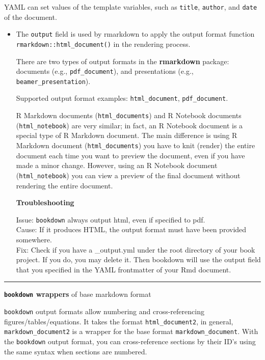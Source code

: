\documentclass[
]{book}
\theoremstyle{definition}
\theoremstyle{definition}
\theoremstyle{definition}
\theoremstyle{definition}
\theoremstyle{remark}
\begin{document}
YAML can set values of the template variables, such as \texttt{title}, \texttt{author}, and \texttt{date} of the document.

\begin{itemize}
\item
  The \texttt{output} field is used by rmarkdown to apply the output format function \texttt{rmarkdown::html\_document()} in the rendering process.

  There are two types of output formats in the \textbf{rmarkdown} package: documents (e.g., \texttt{pdf\_document}), and presentations (e.g., \texttt{beamer\_presentation}).

  Supported output format examples: \texttt{html\_document}, \texttt{pdf\_document}.

  R Markdown documents (\texttt{html\_documents}) and R Notebook documents (\texttt{html\_notebook}) are very similar; in fact, an R Notebook document is a special type of R Markdown document. The main difference is using R Markdown document (\texttt{html\_documents}) you have to knit (render) the entire document each time you want to preview the document, even if you have made a minor change. However, using an R Notebook document (\texttt{html\_notebook}) you can view a preview of the final document without rendering the entire document.

  \textbf{Troubleshooting}

  Issue: \texttt{bookdown} always output html, even if specified to pdf.\\
  Cause: If it produces HTML, the output format must have been provided somewhere.\\
  Fix: Check if you have a \_output.yml under the root directory of your book project. If you do, you may delete it. Then bookdown will use the output field that you specified in the YAML frontmatter of your Rmd document.
\end{itemize}

\begin{center}\rule{0.5\linewidth}{0.5pt}\end{center}

\textbf{\texttt{bookdown} wrappers} of base markdown format

\texttt{bookdown} output formats allow numbering and cross-referencing figures/tables/equations. It takes the format \texttt{html\_document2}, in general, \texttt{markdown\_document2} is a wrapper for the base format \texttt{markdown\_document}. With the \texttt{bookdown} output format, you can cross-reference sections by their ID's using the same syntax when sections are numbered.
\end{document}
